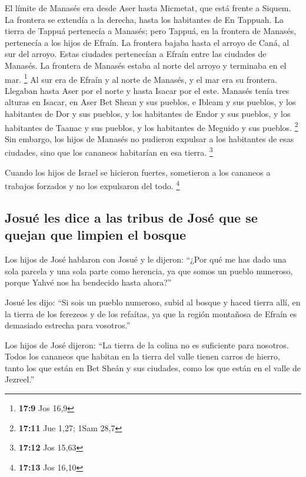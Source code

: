 \begin{paracol}{2}
 El límite de Manasés era desde Aser hasta Micmetat, que
está frente a Siquem. La frontera se extendía a la derecha, hasta los
habitantes de En Tappuah.  La tierra de Tappuá pertenecía
a Manasés; pero Tappuá, en la frontera de Manasés, pertenecía a los
hijos de Efraín.  La frontera bajaba hasta el arroyo de
Caná, al sur del arroyo. Estas ciudades pertenecían a Efraín entre las
ciudades de Manasés. La frontera de Manasés estaba al norte del arroyo y
terminaba en el mar. \footnote{\textbf{17:9} Jos 16,9} 
Al sur era de Efraín y al norte de Manasés, y el mar era su frontera.
Llegaban hasta Aser por el norte y hasta Isacar por el este.
 Manasés tenía tres alturas en Isacar, en Aser Bet Shean
y sus pueblos, e Ibleam y sus pueblos, y los habitantes de Dor y sus
pueblos, y los habitantes de Endor y sus pueblos, y los habitantes de
Taanac y sus pueblos, y los habitantes de Meguido y sus pueblos.
\footnote{\textbf{17:11} Jue 1,27; 1Sam 28,7}  Sin
embargo, los hijos de Manasés no pudieron expulsar a los habitantes de
esas ciudades, sino que los cananeos habitarían en esa tierra.
\footnote{\textbf{17:12} Jos 15,63}

 Cuando los hijos de Israel se hicieron fuertes,
sometieron a los cananeos a trabajos forzados y no los expulsaron del
todo. \footnote{\textbf{17:13} Jos 16,10}

\hypertarget{josuuxe9-les-dice-a-las-tribus-de-josuxe9-que-se-quejan-que-limpien-el-bosque}{%
\subsection{Josué les dice a las tribus de José que se quejan que
limpien el
bosque}\label{josuuxe9-les-dice-a-las-tribus-de-josuxe9-que-se-quejan-que-limpien-el-bosque}}

 Los hijos de José hablaron con Josué y le dijeron:
``¿Por qué me has dado una sola parcela y una sola parte como herencia,
ya que somos un pueblo numeroso, porque Yahvé nos ha bendecido hasta
ahora?''

 Josué les dijo: ``Si sois un pueblo numeroso, subid al
bosque y haced tierra allí, en la tierra de los ferezeos y de los
refaítas, ya que la región montañosa de Efraín es demasiado estrecha
para vosotros.''

 Los hijos de José dijeron: ``La tierra de la colina no
es suficiente para nosotros. Todos los cananeos que habitan en la tierra
del valle tienen carros de hierro, tanto los que están en Bet Sheán y
sus ciudades, como los que están en el valle de Jezreel.''


\end{paracol}
